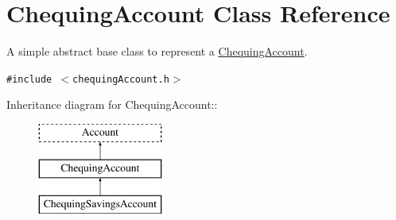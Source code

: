 \hypertarget{classChequingAccount}{
\section{ChequingAccount Class Reference}
\label{classChequingAccount}
}
A simple abstract base class to represent a \hyperlink{classChequingAccount}{ChequingAccount}.  


{\tt \#include $<$chequingAccount.h$>$}

Inheritance diagram for ChequingAccount::\begin{figure}[H]
\begin{center}
\leavevmode
\includegraphics[height=3cm]{classChequingAccount}
\end{center}
\end{figure}

